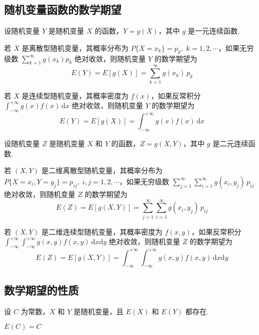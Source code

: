 \subsection{随机变量函数的数学期望}

\begin{theorem}
    设随机变量 $Y$ 是随机变量 $X$ 的函数，$Y=g(X)$，其中 $g$ 是一元连续函数.

    若 $X$ 是离散型随机变量，其概率分布为 $P\{X=x_k\} = p_k, \; k=1,2,\cdots$，如果无穷级数 $\displaystyle\sum_{k=1}^{\infty} g(x_k) p_k$ 绝对收敛，则随机变量 $Y$ 的数学期望为
    $$
    E(Y) = E[g(X)] = \sum_{k=1}^{\infty} g(x_k) \, p_k
    $$

    若 $X$ 是连续型随机变量，其概率密度为 $f(x)$，如果反常积分 $\displaystyle\int_{-\infty}^{+\infty} g(x) f(x) \, \text{d}x$ 绝对收敛，则随机变量 $Y$ 的数学期望为
    $$
    E(Y) = E[g(X)] = \int_{-\infty}^{+\infty} g(x) f(x) \, \text{d}x
    $$
\end{theorem}

\begin{theorem}
    设随机变量 $Z$ 是随机变量 $X$ 和 $Y$ 的函数，$Z=g(X,Y)$，其中 $g$ 是二元连续函数.

    若 $(X,Y)$ 是二维离散型随机变量，其概率分布为 $P\{X=x_i,Y=y_j\} = p_{ij}, \; i,j=1,2,\cdots$，如果无穷级数 $\displaystyle\sum_{j=1}^{\infty} \displaystyle\sum_{i=1}^{\infty} g(x_i,y_j) \, p_{ij}$ 绝对收敛，则随机变量 $Z$ 的数学期望为
    $$
    E(Z) = E[g(X,Y)] = \sum_{j=1}^{\infty} \sum_{i=1}^{\infty} g(x_i,y_j) \, p_{ij}
    $$

    若 $(X,Y)$ 是二维连续型随机变量，其概率密度为 $f(x,y)$，如果反常积分 $\displaystyle\int_{-\infty}^{+\infty} \displaystyle\int_{-\infty}^{+\infty} g(x,y) f(x,y) \, \text{d}x \text{d}y$ 绝对收敛，则随机变量 $Z$ 的数学期望为
    $$
    E(Z) = E[g(X,Y)] = \int_{-\infty}^{+\infty} \int_{-\infty}^{+\infty} g(x,y) f(x,y) \, \text{d}x \text{d}y
    $$
\end{theorem}

\subsection{数学期望的性质}

设 $C$ 为常数，$X$ 和 $Y$ 是随机变量，且 $E(X)$ 和 $E(Y)$ 都存在.

\setcounter{propertyname}{0}

\begin{property} \label{property:E(C)=C}
    $E(C)=C$
\end{property}

